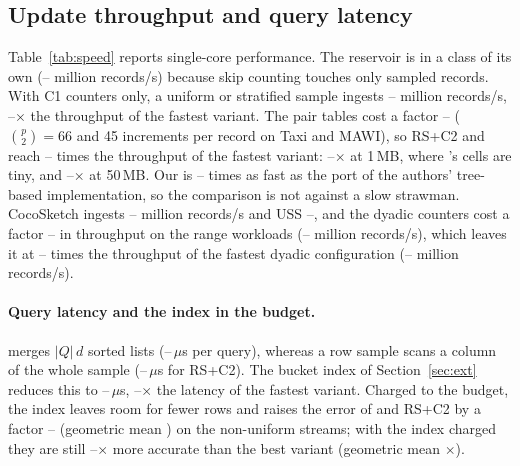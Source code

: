 \subsection{Update throughput and query latency}\label{sec:speed}

\begin{table}[t]
\centering\footnotesize\setlength{\tabcolsep}{2.5pt}
\caption{Update throughput and query latency on one core (median of 3 runs; latency: mean over the 2\,400
queries, after a one-time preparation pass).}
\label{tab:speed}

\end{table}

Table~\ref{tab:speed} reports single-core performance. The reservoir is in a class of its own
(\NumTpResLo--\NumTpResHi{} million records/s) because skip counting touches only sampled records. With C1
counters only, a uniform or stratified sample ingests \NumTpCalOneLo--\NumTpCalOneHi{} million records/s,
\NumTpCsOneVsOmniLo--\NumTpCsOneVsOmniHi$\times$ the throughput of the fastest \omni variant. The pair
tables cost a factor \NumTpPairCostLo--\NumTpPairCostHi{} ($\binom p2=66$ and 45 increments per record on
Taxi and MAWI), so \textsc{RS+C2} and \cs reach \NumTpCalTwoVsOmniLo--\NumTpCalTwoVsOmniHi{} times the
throughput of the fastest \omni variant: \NumTpCalTwoVsOmniOneLo--\NumTpCalTwoVsOmniOneHi$\times$ at 1\,MB,
where \omni's cells are tiny, and \NumTpCalTwoVsOmniFiftyLo--\NumTpCalTwoVsOmniFiftyHi$\times$ at 50\,MB. Our \omni is \NumTpOursVsJavaLo--\NumTpOursVsJavaHi{} times as fast as the port of the authors'
tree-based implementation, so the comparison is not against a slow strawman. CocoSketch ingests
\NumTpNewCocoLo--\NumTpNewCocoHi{} million records/s and USS \NumTpNewUssLo--\NumTpNewUssHi{}, and the
dyadic counters cost \cs a factor \NumRangeTpDyCostLo--\NumRangeTpDyCostHi{} in throughput on the range
workloads (\NumRangeTpDyLo--\NumRangeTpDyHi{} million records/s), which leaves it at
\NumRangeTpVsOmniLo--\NumRangeTpVsOmniHi{} times the throughput of the fastest dyadic \omni
configuration (\NumRangeTpOmniLo--\NumRangeTpOmniHi{} million records/s).

\paragraph{Query latency and the index in the budget.} \omni merges $|Q|\,d$ sorted lists
(\NumQlatOmniLo--\NumQlatOmniHi\,$\mu$s per query), whereas a row sample scans a column of the whole sample
(\NumQlatCalTwoLo--\NumQlatCalTwoHi\,$\mu$s for \textsc{RS+C2}). The bucket index of
Section~\ref{sec:ext} reduces this to \NumQlatIndexLo--\NumQlatIndexHi\,$\mu$s,
\NumQlatIndexVsOmniLo--\NumQlatIndexVsOmniHi$\times$ the latency of the fastest \omni variant. Charged to
the budget, the index leaves room for fewer rows and raises the error of \cs and \textsc{RS+C2} by a factor
\NumIndexCostLo--\NumIndexCostHi{} (geometric mean \NumIndexCostGm) on the non-uniform streams; with the
index charged they are still \NumOmniAnyVsIndexedLo--\NumOmniAnyVsIndexedHi$\times$ more accurate than the
best \omni variant (geometric mean \NumOmniAnyVsIndexedGm$\times$).

